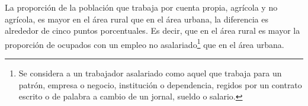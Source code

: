 La proporción de la población que trabaja por cuenta propia, agrícola y no agrícola, es mayor en el área rural que en el área urbana, la diferencia es alrededor de cinco puntos porcentuales. Es decir, que en el área rural es mayor la proporción de ocupados con un empleo no asalariado\footnote{Se considera a un trabajador asalariado como aquel que trabaja para un patrón, empresa o negocio, institución o dependencia, regidos por un contrato escrito o de palabra a cambio de un jornal, sueldo o salario.} que en el  área urbana. 